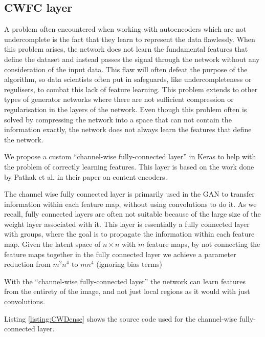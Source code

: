 \subsection{CWFC layer}
A problem often encountered when working with autoencoders which are not undercomplete is the fact that they learn to represent the data flawlessly. \cite{OvercompleteAE} 
When this problem arises, the network does not learn the fundamental features that define the dataset and instead passes the signal through the network without any consideration of the input data.
This flaw will often defeat the purpose of the algorithm, so data scientists often put in safeguards, like undercompleteness or regulisers, to combat this lack of feature learning. 
This problem extends to other types of generator networks where there are not sufficient compression or regularisation in the layers of the network.
Even though this problem often is solved by compressing the network into a space that can not contain the information exactly, the network does not always learn the features that define the network. 

We propose a custom ``channel-wise fully-connected layer'' in Keras to help with the problem of correctly learning features. This layer is based on the work done by Pathak et al. in their paper on content encoders\cite{Pathak_2016}.

The channel wise fully connected layer is primarily used in the GAN to transfer information within each feature map, without using convolutions to do it. As we recall, fully connected layers are often not suitable because of the large size of the weight layer associated with it. This layer is essentially a fully connected layer with groups, where the goal is to propagate the information within each feature map.
Given the latent space of $n \times n$ with $m$ feature maps, by not connecting the feature maps together in the fully connected layer we achieve a parameter reduction from $m^2n^4$ to $mn^4$ (ignoring bias terms) \cite{Pathak_2016}

With the ``channel-wise fully-connected layer'' the network can learn features from the entirety of the image, and not just local regions as it would with just convolutions. 

Listing \ref{listing:CWDense} shows the source code used for the channel-wise fully-connected layer.

